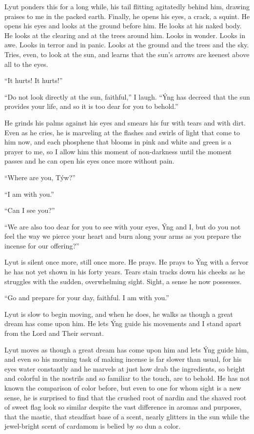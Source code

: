 Lyut ponders this for a long while, his tail flitting agitatedly behind him, drawing praises to me in the packed earth. Finally, he opens his eyes, a crack, a squint. He opens his eyes and looks at the ground before him. He looks at his naked body. He looks at the clearing and at the trees around him. Looks in wonder. Looks in awe. Looks in terror and in panic. Looks at the ground and the trees and the sky. Tries, even, to look at the sun, and learns that the sun's arrows are keenest above all to the eyes.

``It hurts! It hurts!''

``Do not look directly at the sun, faithful,'' I laugh. ``Ýng has decreed that the sun provides your life, and so it is too dear for you to behold.''

He grinds his palms against his eyes and smears his fur with tears and with dirt. Even as he cries, he is marveling at the flashes and swirls of light that come to him now, and each phosphene that blooms in pink and white and green is a prayer to me, so I allow him this moment of non-darkness until the moment passes and he can open his eyes once more without pain.

``Where are you, Týw?''

``I am with you.''

``Can I see you?''

``We are also too dear for you to see with your eyes, Ýng and I, but do you not feel the way we pierce your heart and burn along your arms as you prepare the incense for our offering?''

Lyut is silent once more, still once more. He prays. He prays to Ýng with a fervor he has not yet shown in his forty years. Tears stain tracks down his cheeks as he struggles with the sudden, overwhelming sight. Sight, a sense he now possesses.

``Go and prepare for your day, faithful. I am with you.''

\secdiv

\noindent Lyut is slow to begin moving, and when he does, he walks as though a great dream has come upon him. He lets Ýng guide his movements and I stand apart from the Lord and Their servant.

Lyut moves as though a great dream has come upon him and lets Ýng guide him, and even so his morning task of making incense is far slower than usual, for his eyes water constantly and he marvels at just how drab the ingredients, so bright and colorful in the nostrils and so familiar to the touch, are to behold. He has not known the comparison of color before, but even to one for whom sight is a new sense, he is surprised to find that the crushed root of nardin and the shaved root of sweet flag look so similar despite the vast difference in aromas and purposes, that the mastic, that steadfast base of a scent, nearly glitters in the sun while the jewel-bright scent of cardamom is belied by so dun a color.

